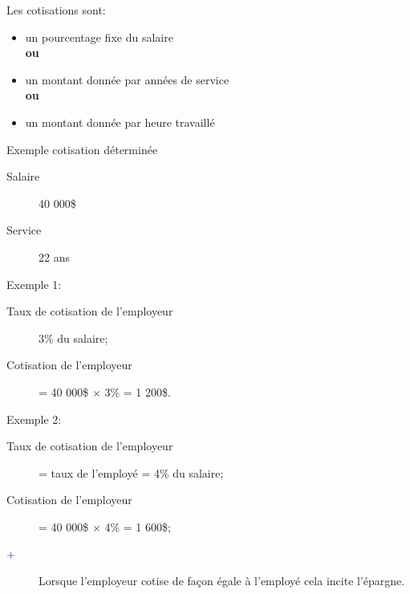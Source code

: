 \documentclass[10pt, french]{article}
\begin{document}
\begin{multicols*}{3}
\begin{definitionNOHFILL}
Les cotisations sont: 
\begin{itemize}[leftmargin = *]
	\item	un pourcentage fixe du salaire \\
			\textbf{ou}
	\item	un montant donnée par années de service\\
			\textbf{ou}
	\item	un montant donnée par heure travaillé
\end{itemize}
\end{definitionNOHFILL}

\begin{conceptgen}{Exemple cotisation déterminée}
\begin{description}
	\item[Salaire]	40 000\$
	\item[Service]	22 ans
\end{description}
\tcbline
Exemple 1: 
\begin{description}
	\item[Taux de cotisation de l'employeur]	3\% du salaire;
	\item[Cotisation de l'employeur]	= 40 000\$ $\times$ 3\% = 1 200\$.
\end{description}	 
	
\tcbline

Exemple 2: 
\begin{description}
	\item[Taux de cotisation de l'employeur]	= taux de l'employé = 4\% du salaire;
	\item[Cotisation de l'employeur]	= 40 000\$ $\times$ 4\% = 1 600\$;
	\item[$\color{blue}+$]	Lorsque l'employeur cotise de façon égale à l'employé cela incite l'épargne.
\end{description}
	
\tcbline


\end{conceptgen}
\end{multicols*}
\end{document}
